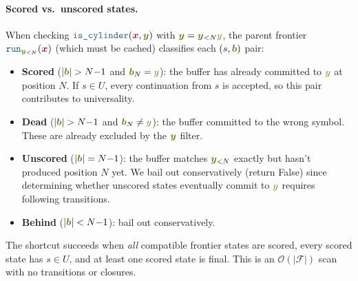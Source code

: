 \documentclass{article}
\theoremstyle{plain}
\newcommand{\mymacro}[1]{#1}
\newcommand{\srcStr}{\ensuremath{{\color{TokenColor}\boldsymbol{x}}}\xspace}
\newcommand{\tgtSym}{{\color{CharacterColor}y}}
\newcommand{\tgtStr}{{\color{CharacterColor}\boldsymbol{y}}}
\newcommand{\state}{\mymacro{s}}
\newcommand{\frontier}{\mathcal{F}}
\newcommand{\buffer}{{\color{CharacterColor}\boldsymbol{b}}}
\newcommand{\myMintedFunc}[1]{\mbox{\texttt{{\color{StormBlue}#1}}}}
\newcommand{\continuous}[0]{\myMintedFunc{is\_cylinder}}
\newcommand{\runFrontier}[0]{\myMintedFunc{run}}
\newcommand{\ipUniversalStates}[0]{U}
\begin{document}
\paragraph{Scored vs.\ unscored states.}
When checking $\continuous(\srcStr, \tgtStr)$ with $\tgtStr = \tgtStr_{<N}\tgtSym$,
the parent frontier $\runFrontier_{\tgtStr_{<N}}(\srcStr)$ (which must be cached)
classifies each $(\state, \buffer)$ pair:
\begin{itemize}
\item \textbf{Scored} ($|\buffer| > N{-}1$ and $\buffer_N = \tgtSym$): the buffer has already
  committed to $\tgtSym$ at position $N$.  If $\state \in \ipUniversalStates$,
  every continuation from $\state$ is accepted, so this pair contributes to
  universality.
\item \textbf{Dead} ($|\buffer| > N{-}1$ and $\buffer_N \ne \tgtSym$): the buffer committed to
  the wrong symbol.  These are already excluded by the $\tgtStr$ filter.
\item \textbf{Unscored} ($|\buffer| = N{-}1$): the buffer matches $\tgtStr_{<N}$ exactly but
  hasn't produced position $N$ yet.  We bail out conservatively (return
  False) since determining whether unscored states eventually commit to
  $\tgtSym$ requires following transitions.
\item \textbf{Behind} ($|\buffer| < N{-}1$): bail out conservatively.
\end{itemize}

The shortcut succeeds when \emph{all} compatible frontier states are scored,
every scored state has $\state \in \ipUniversalStates$, and at least one scored
state is final.  This is an $\mathcal{O}(|\frontier|)$ scan with no transitions
or closures.
\end{document}
